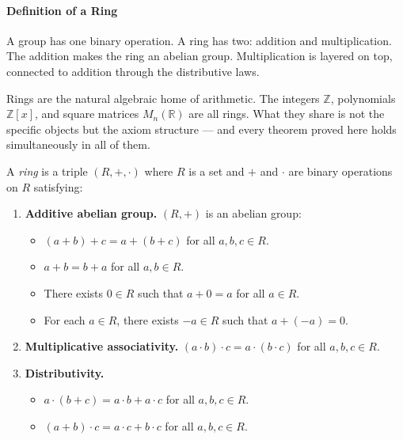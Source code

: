\paragraph{Definition of a Ring}

\begin{remark}[Motivation]
A group has one binary operation. A ring has two: addition and
multiplication. The addition makes the ring an abelian group.
Multiplication is layered on top, connected to addition through
the distributive laws.

Rings are the natural algebraic home of arithmetic. The integers
$\mathbb{Z}$, polynomials $\mathbb{Z}[x]$, and square matrices
$M_n(\mathbb{R})$ are all rings. What they share is not the
specific objects but the axiom structure --- and every theorem
proved here holds simultaneously in all of them.
\end{remark}

\begin{definition}[Ring]
\label{def:notes-rings-definition-l19}
A \emph{ring} is a triple $(R, +, \cdot)$ where $R$ is a set and
$+$ and $\cdot$ are binary operations on $R$ satisfying:

\begin{enumerate}[label=\textbf{R\arabic*.}]
  \item \textbf{Additive abelian group.}
        $(R, +)$ is an abelian group:
        \begin{itemize}
          \item $(a + b) + c = a + (b + c)$ for all $a,b,c \in R$.
          \item $a + b = b + a$ for all $a, b \in R$.
          \item There exists $0 \in R$ such that $a + 0 = a$ for all $a \in R$.
          \item For each $a \in R$, there exists $-a \in R$ such that
                $a + (-a) = 0$.
        \end{itemize}

  \item \textbf{Multiplicative associativity.}
        $(a \cdot b) \cdot c = a \cdot (b \cdot c)$
        for all $a, b, c \in R$.

  \item \textbf{Distributivity.}
        \begin{itemize}
          \item $a \cdot (b + c) = a \cdot b + a \cdot c$
                for all $a,b,c \in R$.
          \item $(a + b) \cdot c = a \cdot c + b \cdot c$
                for all $a,b,c \in R$.
        \end{itemize}
\end{enumerate}
\end{definition}

